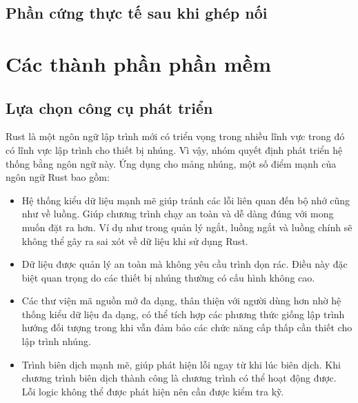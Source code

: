 \subsection{Phần cứng thực tế sau khi ghép nối}

\section{Các thành phần phần mềm}

\subsection{Lựa chọn công cụ phát triển}
Rust là một ngôn ngữ lập trình mới có triển vọng trong nhiều lĩnh vực trong đó có lĩnh vực lập trình cho thiết bị nhúng. Vì vậy, nhóm quyết định phát triển hệ thống bằng ngôn ngữ này. Ứng dụng cho mảng nhúng, một số điểm mạnh của ngôn ngữ Rust bao gồm:
\begin{itemize}
    \item Hệ thống kiểu dữ liệu mạnh mẽ giúp tránh các lỗi liên quan đến bộ nhớ cũng như về luồng. Giúp chương trình chạy an toàn và dễ dàng đúng với mong muốn đặt ra hơn. Ví dụ như trong quản lý ngắt, luồng ngắt và luồng chính sẽ không thể gây ra sai xót về dữ liệu khi sử dụng Rust.
    \item Dữ liệu được quản lý an toàn mà không yêu cầu trình dọn rác. Điều này đặc biệt quan trọng do các thiết bị nhúng thường có cấu hình không cao.
    \item Các thư viện mã nguồn mở đa dạng, thân thiện với người dùng hơn nhờ hệ thống kiểu dữ liệu đa dạng, có thể tích hợp các phương thức giống lập trình hướng đối tượng trong khi vẫn đảm bảo các chức năng cấp thấp cần thiết cho lập trình nhúng.
    \item Trình biên dịch mạnh mẽ, giúp phát hiện lỗi ngay từ khi lúc biên dịch. Khi chương trình biên dịch thành công là chương trình có thể hoạt động được. Lỗi logic không thể được phát hiện nên cần được kiểm tra kỹ.
\end{itemize}


